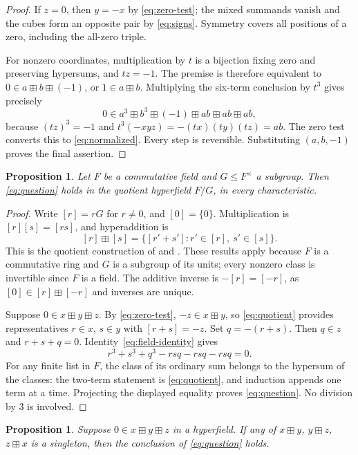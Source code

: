 \documentclass[11pt]{article}
\newtheorem{proposition}[theorem]{Proposition}
\theoremstyle{remark}
\newcommand{\hs}{\boxplus}
\begin{document}
\begin{proof}
If $z=0$, then $y=-x$ by \eqref{eq:zero-test}; the mixed summands
vanish and the cubes form an opposite pair by \eqref{eq:signs}.
Symmetry covers all positions of a zero, including the all-zero triple.

For nonzero coordinates, multiplication by $t$ is a bijection fixing
zero and preserving hypersums, and $tz=-1$. The premise is therefore
equivalent to $0\in a\hs b\hs(-1)$, or $1\in a\hs b$.
Multiplying the six-term conclusion by $t^3$ gives precisely
\[
 0\in a^3\hs b^3\hs(-1)\hs ab\hs ab\hs ab,
\]
because $(tz)^3=-1$ and $t^3(-xyz)=-(tx)(ty)(tz)=ab$.
The zero test converts this to \eqref{eq:normalized}. Every step is
reversible. Substituting $(a,b,-1)$ proves the final assertion.
\end{proof}

\begin{proposition}\label{prop:quotient}
Let $F$ be a commutative field and $G\le F^\times$ a subgroup.
Then \eqref{eq:question} holds in the quotient hyperfield $F/G$,
in every characteristic.
\end{proposition}

\begin{proof}
Write $[r]=rG$ for $r\ne0$, and $[0]=\{0\}$. Multiplication is
$[r][s]=[rs]$, and hyperaddition is
\begin{equation}\label{eq:quotient}
 [r]\hs[s]=\{[r'+s']:r'\in[r],\ s'\in[s]\}.
\end{equation}
This is the quotient construction of
\cite[Proposition~2.5]{CC} and \cite[Remark~2.7]{BB}.
These results apply because $F$ is a commutative ring and $G$ is a
subgroup of its units; every nonzero class is invertible since $F$
is a field. The additive inverse is $-[r]=[-r]$, as
$[0]\in[r]\hs[-r]$ and inverses are unique.

Suppose $0\in x\hs y\hs z$. By \eqref{eq:zero-test},
$-z\in x\hs y$, so \eqref{eq:quotient} provides representatives
$r\in x$, $s\in y$ with $[r+s]=-z$. Set $q=-(r+s)$.
Then $q\in z$ and $r+s+q=0$. Identity~\eqref{eq:field-identity} gives
\[
 r^3+s^3+q^3-rsq-rsq-rsq=0.
\]
For any finite list in $F$, the class of its ordinary sum belongs to
the hypersum of the classes: the two-term statement is
\eqref{eq:quotient}, and induction appends one term at a time.
Projecting the displayed equality proves \eqref{eq:question}.
No division by $3$ is involved.
\end{proof}

\begin{proposition}\label{prop:singleton}
Suppose $0\in x\hs y\hs z$ in a hyperfield. If any of
$x\hs y$, $y\hs z$, $z\hs x$ is a singleton, then the conclusion
of \eqref{eq:question} holds.
\end{proposition}
\end{document}
